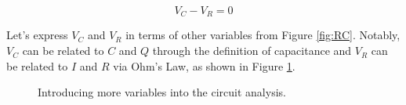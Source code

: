 \documentclass{article}
\begin{document}
\begin{equation*}
    V_C-V_R=0
\end{equation*}

Let's express $V_C$ and $V_R$ in terms of other variables from Figure \ref{fig:RC}. Notably, $V_C$ can be related to $C$ and $Q$ through the definition of capacitance and $V_R$ can be related to $I$ and $R$ via Ohm's Law, as shown in Figure \ref{fig:tree}.

\begin{figure}[h!]
    \centering
    \caption{Introducing more variables into the circuit analysis.}
    \label{fig:tree}
\end{figure}
\end{document}
